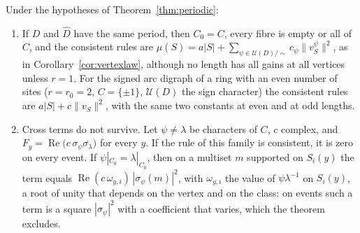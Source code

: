 \begin{corollary}\label{cor:periodic}
Under the hypotheses of Theorem~\ref{thm:periodic}:
\begin{enumerate}
\item[(1)] If $D$ and $\hat D$ have the same period, then $C_0=C$, every fibre is empty or all of $C$, and the consistent rules are $\mu(S)=a|S|+\sum_{\psi\in\mathcal{U}(D)/\sim}c_\psi\lVert v^\psi_S\rVert^2$, as in Corollary~\ref{cor:vertexlaw}, although no length has all gains at all vertices unless $r=1$. For the signed arc digraph of a ring with an even number of sites ($r=r_0=2$, $C=\{\pm1\}$, $\mathcal{U}(D)$ the sign character) the consistent rules are $a|S|+c\lVert v_S\rVert^2$, with the same two constants at even and at odd lengths.
\item[(2)] Cross terms do not survive. Let $\psi\ne\lambda$ be characters of $C$, $c$ complex, and $F_y=\operatorname{Re}\bigl(c\,\sigma_\psi\overline{\sigma_\lambda}\bigr)$ for every $y$. If the rule of this family is consistent, it is zero on every event. If $\psi|_{C_0}=\lambda|_{C_0}$, then on a multiset $m$ supported on $S_i(y)$ the term equals $\operatorname{Re}(c\,\omega_{y,i})\,|\sigma_\psi(m)|^2$, with $\omega_{y,i}$ the value of $\psi\lambda^{-1}$ on $S_i(y)$, a root of unity that depends on the vertex and on the class: on events such a term is a square $|\sigma_\psi|^2$ with a coefficient that varies, which the theorem excludes.
\end{enumerate}
\end{corollary}
